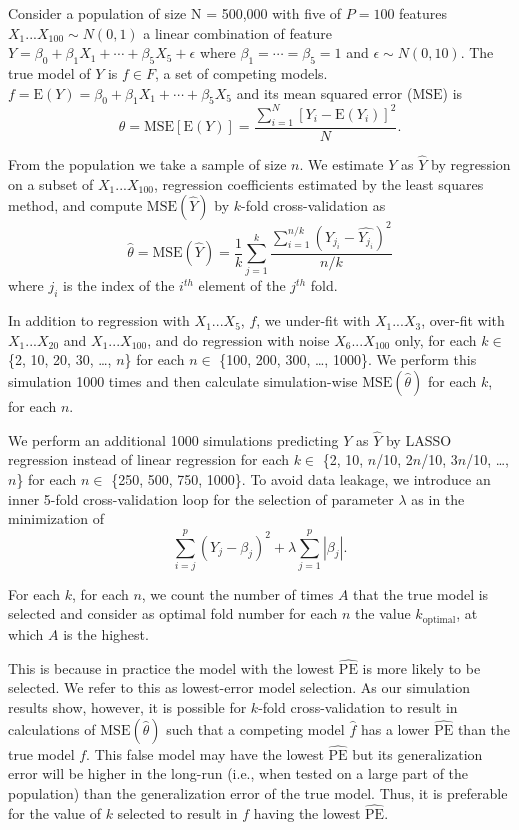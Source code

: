 \documentclass[
  12pt,
]{article}
\begin{document}
Consider a population of size N = 500,000 with five of \(P = 100\)
features \(X_1...X_{100} \sim N(0, 1)\) a linear combination of feature
\(Y = \beta_0 + \beta_1X_1 + \cdots + \beta_5X_5 + \epsilon\) where
\(\beta_1 = \cdots = \beta_5 = 1\) and \(\epsilon \sim N(0, 10)\). The
true model of \(Y\) is \(f \in F\), a set of competing models.
\(f = \mathrm{E}(Y) = \beta_0 + \beta_1X_1 + \cdots + \beta_5X_5\) and
its mean squared error (\(\mathrm{MSE}\)) is
\[\theta = \mathrm{MSE}[\mathrm{E}(Y)] = \frac{\sum_{i=1}^{N}[Y_i - \mathrm{E}(Y_i)]^2}{N}.\]

From the population we take a sample of size \(n\). We estimate \(Y\) as
\(\hat{Y}\) by regression on a subset of \(X_1...X_{100}\), regression
coefficients estimated by the least squares method, and compute
\(\mathrm{MSE}(\hat{Y})\) by \(k\)-fold cross-validation as
\[\hat{\theta} = \mathrm{MSE}(\hat{Y}) = \frac{1}{k}\sum_{j=1}^{k}\frac{\sum_{i=1}^{n/k}(Y_{j_i} - \hat{Y_{j_i}})^2}{n/k}\]
where \(j_i\) is the index of the \(i^{th}\) element of the \(j^{th}\)
fold.

In addition to regression with \(X_1...X_5\), \(f\), we under-fit with
\(X_1...X_3\), over-fit with \(X_1...X_{20}\) and \(X_1...X_{100}\), and
do regression with noise \(X_6...X_{100}\) only, for each \(k \in\) \{2,
10, 20, 30, \ldots, \(n\)\} for each \(n \in\) \{100, 200, 300, \ldots,
1000\}. We perform this simulation 1000 times and then calculate
simulation-wise \(\mathrm{MSE}(\hat{\theta})\) for each \(k\), for each
\(n\).

We perform an additional 1000 simulations predicting \(Y\) as
\(\hat{Y}\) by LASSO regression instead of linear regression for each
\(k \in\) \{2, 10, \(n\)/10, 2\(n\)/10, 3\(n\)/10, \ldots, \(n\)\} for
each \(n \in\) \{250, 500, 750, 1000\}. To avoid data leakage, we
introduce an inner 5-fold cross-validation loop for the selection of
parameter \(\lambda\) as in the minimization of
\[\sum_{i=j}^{p}(Y_j - \beta_j)^2 + \lambda\sum_{j=1}^{p}|\beta_j|.\]

For each \(k\), for each \(n\), we count the number of times \(A\) that
the true model is selected and consider as optimal fold number for each
\(n\) the value \(k_\mathrm{optimal}\), at which \(A\) is the highest.

This is because in practice the model with the lowest
\(\mathrm{\widehat{PE}}\) is more likely to be selected. We refer to
this as lowest-error model selection. As our simulation results show,
however, it is possible for \(k\)-fold cross-validation to result in
calculations of \(\mathrm{MSE}(\hat{\theta})\) such that a competing
model \(\hat{f}\) has a lower \(\mathrm{\widehat{PE}}\) than the true
model \(f\). This false model may have the lowest
\(\mathrm{\widehat{PE}}\) but its generalization error will be higher in
the long-run (i.e., when tested on a large part of the population) than
the generalization error of the true model. Thus, it is preferable for
the value of \(k\) selected to result in \(f\) having the lowest
\(\mathrm{\widehat{PE}}\).
\end{document}
